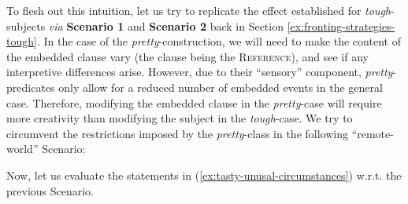 \documentclass[11pt]{article}
\begin{document}
To flesh out this intuition, let us try to replicate the effect established for \textit{tough}-subjects \textit{via} \textbf{Scenario 1} and \textbf{Scenario 2} back in Section \ref{ex:fronting-strategies-tough}. In the case of the \textit{pretty}-construction, we will need to make the content of the embedded clause vary (the clause being the \textsc{Reference}), and see if any interpretive differences arise. However, due to their ``sensory'' component, \textit{pretty}-predicates only allow for a reduced number of embedded events in the general case. Therefore, modifying the embedded clause in the \textit{pretty}-case will require more creativity than modifying the subject in the \textit{tough}-case. We try to circumvent the restrictions imposed by the \textit{pretty}-class in the following ``remote-world'' Scenario:

\begin{center}
\end{center}
Now, let us evaluate the statements in (\ref{ex:tasty-unusal-circumstances}) w.r.t. the previous Scenario.
\begin{exe}
	\ex 
	\begin{xlist}
		\label{ex:tasty-visual}
		\label{ex:tasty-gustative}
	\end{xlist}\label{ex:tasty-unusal-circumstances}
\end{exe}
\end{document}
